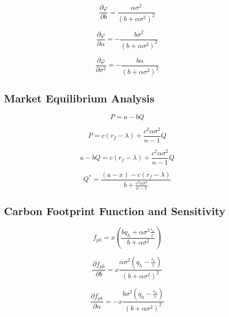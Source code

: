 \documentclass[12pt,a4paper]{article}
\begin{document}
\begin{equation}
\frac{\partial \varphi}{\partial b} = \frac{\alpha \sigma^2}{(b + \alpha \sigma^2)^2}
\end{equation}

\begin{equation}
\frac{\partial \varphi}{\partial \alpha} = - \frac{b \sigma^2}{(b + \alpha \sigma^2)^2}
\end{equation}

\begin{equation}
\frac{\partial \varphi}{\partial \sigma^2} = - \frac{b \alpha}{(b + \alpha \sigma^2)^2}
\end{equation}

\subsection*{Market Equilibrium Analysis}

\begin{equation}
P = a - b Q
\end{equation}

\begin{equation}
P = c (r_f - \lambda) + \frac{c^2 \alpha \sigma^2}{n - 1} Q
\end{equation}

\begin{equation}
a - b Q = c (r_f - \lambda) + \frac{c^2 \alpha \sigma^2}{n - 1} Q
\end{equation}

\begin{equation}
Q^* = \frac{(a - x) - c (r_f - \lambda)}{b + \frac{c^2 \alpha \sigma^2}{n - 1}}
\end{equation}

\subsection*{Carbon Footprint Function and Sensitivity}

\begin{equation}
f_{ph} = x \left( \frac{b q_h + \alpha \sigma^2 \frac{i_h}{c}}{b + \alpha \sigma^2} \right)
\end{equation}

\begin{equation}
\frac{\partial f_{ph}}{\partial b} = x \frac{\alpha \sigma^2 \left(q_h - \frac{i_h}{c} \right)}{(b + \alpha \sigma^2)^2}
\end{equation}

\begin{equation}
\frac{\partial f_{ph}}{\partial \alpha} = - x \frac{b \sigma^2 \left(q_h - \frac{i_h}{c} \right)}{(b + \alpha \sigma^2)^2}
\end{equation}
\end{document}
